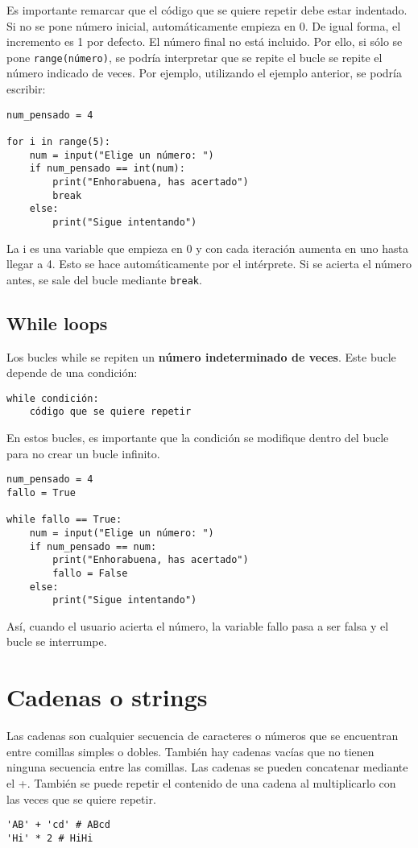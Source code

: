 Es importante remarcar que el código que se quiere repetir debe estar indentado. Si no se pone número inicial, automáticamente empieza en 0. De igual forma, el incremento es 1 por defecto. El número final no está incluido. Por ello, si sólo se pone \texttt{range(número)}, se podría interpretar que se repite el bucle se repite el número indicado de veces. Por ejemplo, utilizando el ejemplo anterior, se podría escribir:
\begin{lstlisting}
num_pensado = 4

for i in range(5):
	num = input("Elige un número: ")
	if num_pensado == int(num):
		print("Enhorabuena, has acertado")
		break
	else:
		print("Sigue intentando")
\end{lstlisting}

La i es una variable que empieza en 0 y con cada iteración aumenta en uno hasta llegar a 4. Esto se hace automáticamente por el intérprete. Si se acierta el número antes, se sale del bucle mediante \texttt{break}.

\subsection{While loops}
Los bucles while se repiten un \textbf{número indeterminado de veces}. Este bucle depende de una condición:
\begin{lstlisting}
while condición:
	código que se quiere repetir
\end{lstlisting}

En estos bucles, es importante que la condición se modifique dentro del bucle para no crear un bucle infinito. 
\begin{lstlisting}
num_pensado = 4
fallo = True

while fallo == True:
	num = input("Elige un número: ")
	if num_pensado == num:
		print("Enhorabuena, has acertado")
		fallo = False
	else:
		print("Sigue intentando")
\end{lstlisting}
Así, cuando el usuario acierta el número, la variable fallo pasa a ser falsa y el bucle se interrumpe.

\section{Cadenas o strings}
Las cadenas son cualquier secuencia de caracteres o números que se encuentran entre comillas simples o dobles. También hay cadenas vacías que no tienen ninguna secuencia entre las comillas. Las cadenas se pueden concatenar mediante el +. También se puede repetir el contenido de una cadena al multiplicarlo con las veces que se quiere repetir.
\begin{lstlisting}
'AB' + 'cd' # ABcd
'Hi' * 2 # HiHi 
\end{lstlisting}

